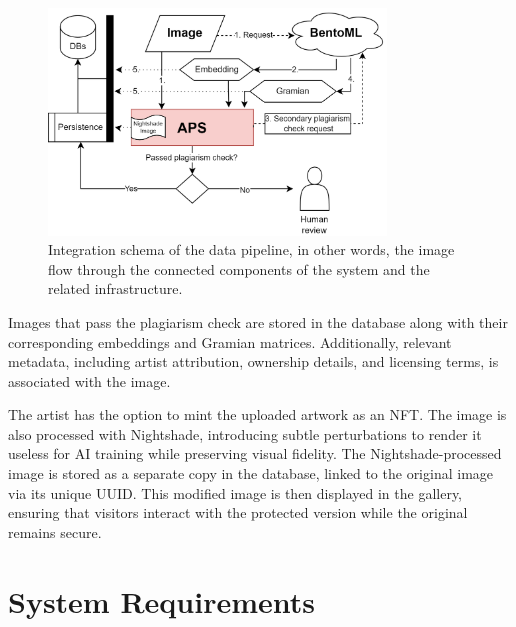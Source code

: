 \begin{figure}[ht]
    \centering
    \includegraphics[width=0.8\textwidth]{figs/integ.png}
    \caption{Integration schema of the data pipeline, in other words, the image flow through the connected components of the system and the related infrastructure.}
    \label{fig:pipeline}
\end{figure}

Images that pass the plagiarism check are stored in the database along with their corresponding embeddings and Gramian matrices. Additionally, relevant metadata, including artist attribution, ownership details, and licensing terms, is associated with the image.

The artist has the option to mint the uploaded artwork as an NFT. The image is also processed with Nightshade, introducing subtle perturbations to render it useless for AI training while preserving visual fidelity. The Nightshade-processed image is stored as a separate copy in the database, linked to the original image via its unique UUID. This modified image is then displayed in the gallery, ensuring that visitors interact with the protected version while the original remains secure.

\newpage

\chapter{System Requirements}
